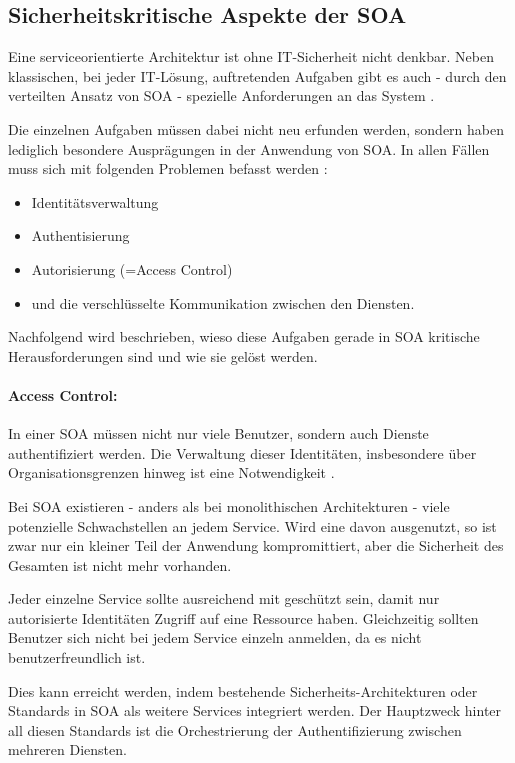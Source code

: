 \subsection{Sicherheitskritische Aspekte der SOA}
\label{sec:securityAspects}

Eine serviceorientierte Architektur ist ohne IT-Sicherheit nicht denkbar. Neben klassischen, bei jeder IT-Lösung, auftretenden Aufgaben gibt es auch - durch den verteilten Ansatz von SOA - spezielle Anforderungen an das System \cite{BITKOM.2009}.

Die einzelnen Aufgaben müssen dabei nicht neu erfunden werden, sondern haben lediglich besondere Ausprägungen in der Anwendung von SOA. In allen Fällen muss sich mit folgenden Problemen befasst werden \cite{BITKOM.2009}:\begin{itemize}
    \item Identitätsverwaltung
    \item Authentisierung
    \item Autorisierung (=Access Control)
    \item und die verschlüsselte Kommunikation zwischen den Diensten.
\end{itemize}

Nachfolgend wird beschrieben, wieso diese Aufgaben gerade in SOA kritische Herausforderungen sind und wie sie gelöst werden.

\paragraph{Access Control:}

In einer SOA müssen nicht nur viele Benutzer, sondern auch Dienste authentifiziert werden. Die Verwaltung dieser Identitäten, insbesondere über Organisationsgrenzen hinweg ist eine Notwendigkeit \cite{BITKOM.2009}.

Bei SOA existieren - anders als bei monolithischen Architekturen - viele potenzielle Schwachstellen an jedem Service. Wird eine davon ausgenutzt, so ist zwar nur ein kleiner Teil der Anwendung kompromittiert, aber die Sicherheit des Gesamten ist nicht mehr vorhanden.

Jeder einzelne Service sollte ausreichend mit geschützt sein, damit nur autorisierte Identitäten Zugriff auf eine Ressource haben. Gleichzeitig sollten Benutzer sich nicht bei jedem Service einzeln anmelden, da es nicht benutzerfreundlich ist.

Dies kann erreicht werden, indem bestehende Sicherheits-Architekturen oder Standards in SOA als weitere Services integriert werden. Der Hauptzweck hinter all diesen Standards ist die Orchestrierung der Authentifizierung zwischen mehreren Diensten.

